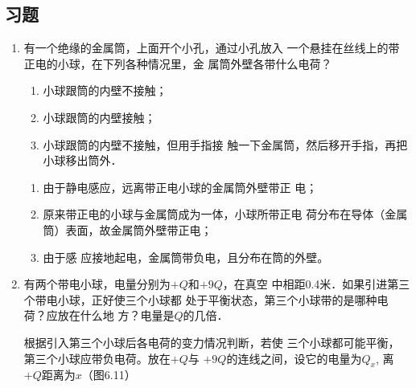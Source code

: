 \subsection{习题}
\begin{enumerate}
\item 有一个绝缘的金属筒，上面开个小孔，通过小孔放入
一个悬挂在丝线上的带正电的小球，在下列各种情况里，金
属筒外壁各带什么电荷？
\begin{enumerate}
\item 小球跟筒的内壁不接触；
\item 小球跟筒的内壁接触；
\item 小球跟筒的内壁不接触，但用手指接
触一下金属筒，然后移开手指，再把小球移出筒外．
\end{enumerate}


\begin{solution}
\begin{enumerate}
    \item 由于静电感应，远离带正电小球的金属筒外壁带正
    电；
    \item 原来带正电的小球与金属筒成为一体，小球所带正电
    荷分布在导体（金属筒）表面，故金属筒外壁带正电；
    \item 由于感
    应接地起电，金属筒带负电，且分布在筒的外壁。
\end{enumerate}
\end{solution}

\item 有两个带电小球，电量分别为$+Q$和$+9Q$，在真空
中相距0.4米．如果引进第三个带电小球，正好使三个小球都
处于平衡状态，第三个小球带的是哪种电荷？应放在什么地
方？电量是$Q$的几倍．

\begin{solution}
根据引入第三个小球后各电荷的变力情况判断，若使
三个小球都可能平衡，第三个小球应带负电荷。放在$+Q$与
$+9Q$的连线之间，设它的电量为$Q_x$, 离$+Q$距离为$x$（图6.11）
\begin{figure}[htp]
    \centering
{}
    \caption{}
\end{figure}


\end{solution}
\end{enumerate}
